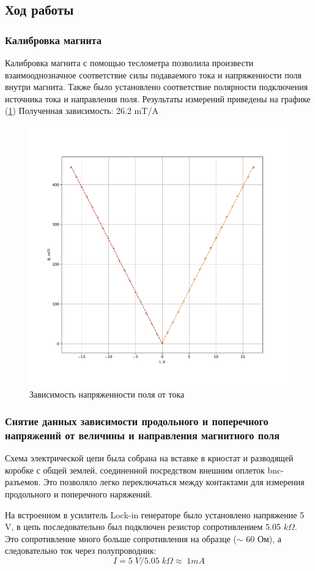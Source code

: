 \documentclass[a4paper, 12pt]{article}
\begin{document}
\subsection{Ход работы}

\subsubsection{Калибровка магнита}

Калибровка магнита с помощью теслометра позволила произвести взаимооднозначное соответствие силы подаваемого тока и напряженности поля внутри магнита. Также было установлено соответствие полярности подключения источника тока и направления поля. Результаты измерений приведены на графике (\ref{fig:3_calib}) Полученная зависимость: 26.2 mT/A

\begin{figure}[H]
	\centering
	\includegraphics[width=0.7\linewidth]{3_Calibration.pdf}
	\caption{Зависимость напряженности поля от тока}
	\label{fig:3_calib}
\end{figure}

\subsubsection{Снятие данных зависимости продольного и поперечного напряжений от величины и направления магнитного поля }
Схема электрической цепи была собрана на вставке в криостат и разводящей коробке с общей землей, соединенной посредством внешним оплеток bnc-разъемов. Это позволяло легко переключаться между контактами для измерения продольного и поперечного  наряжений.

На встроенном в усилитель Lock-in генераторе было установлено напряжение 5 V, в цепь последовательно был подключен резистор сопротивлением 5.05 $k\Omega$. Это сопротивление много больше сопротивления на образце ($\sim$ 60 Ом), а следовательно ток через полупроводник: $$I=5 \;V/5.05 \; k\Omega\approx \;1mA$$
\end{document}
